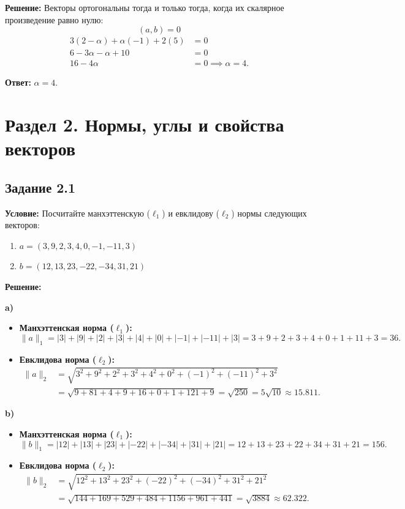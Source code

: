 \documentclass[11pt, a4paper]{article}
\begin{document}
\textbf{Решение:}
Векторы ортогональны тогда и только тогда, когда их скалярное произведение равно нулю:
$$ (a, b) = 0 $$
\begin{align*}
3(2 - \alpha) + \alpha(-1) + 2(5) &= 0 \\
6 - 3\alpha - \alpha + 10 &= 0 \\
16 - 4\alpha &= 0 \implies \alpha = 4.
\end{align*}

\textbf{Ответ:} $\alpha = 4$.

\newpage

\section{Раздел 2. Нормы, углы и свойства векторов}

\subsection*{Задание 2.1}
\textbf{Условие:} Посчитайте манхэттенскую ($\ell_1$) и евклидову ($\ell_2$) нормы следующих векторов:
\begin{enumerate}[label=\alph*)]
\item $a = (3, 9, 2, 3, 4, 0, -1, -11, 3)$
\item $b = (12, 13, 23, -22, -34, 31, 21)$
\end{enumerate}

\textbf{Решение:}

\textbf{a)}
\begin{itemize}
\item \textbf{Манхэттенская норма ($\ell_1$):}
$$ \|a\|_1 = |3| + |9| + |2| + |3| + |4| + |0| + |-1| + |-11| + |3| = 3+9+2+3+4+0+1+11+3 = 36. $$
\item \textbf{Евклидова норма ($\ell_2$):}
\begin{align*}
\|a\|_2 &= \sqrt{3^2 + 9^2 + 2^2 + 3^2 + 4^2 + 0^2 + (-1)^2 + (-11)^2 + 3^2} \\
&= \sqrt{9 + 81 + 4 + 9 + 16 + 0 + 1 + 121 + 9} = \sqrt{250} = 5\sqrt{10} \approx 15.811.
\end{align*}
\end{itemize}

\textbf{b)}
\begin{itemize}
\item \textbf{Манхэттенская норма ($\ell_1$):}
$$ \|b\|_1 = |12| + |13| + |23| + |-22| + |-34| + |31| + |21| = 12+13+23+22+34+31+21 = 156. $$
\item \textbf{Евклидова норма ($\ell_2$):}
\begin{align*}
\|b\|_2 &= \sqrt{12^2 + 13^2 + 23^2 + (-22)^2 + (-34)^2 + 31^2 + 21^2} \\
&= \sqrt{144 + 169 + 529 + 484 + 1156 + 961 + 441} = \sqrt{3884} \approx 62.322.
\end{align*}
\end{itemize}
\end{document}
